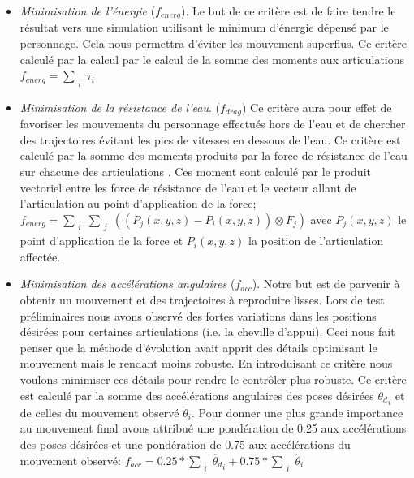 \documentclass[runningheads,a4paper]{llncs}
\begin{document}
\begin{itemize}
\item{\textit{Minimisation de l'énergie} ($f_{energ}$). Le but de ce critère est de faire tendre le résultat vers une simulation utilisant le minimum d'énergie dépensé par le personnage. Cela nous permettra d'éviter les mouvement superflus. Ce critère calculé par la calcul par le calcul de la somme des moments aux articulations $f_{energ}=\sum_{\substack{i}}{\tau_i}$} 
\item{\textit{Minimisation de la résistance de l'eau}. ($f_{drag}$) Ce critère aura pour effet de favoriser les mouvements du personnage effectués hors de l'eau et de chercher des trajectoires évitant les pics de vitesses en dessous de l'eau. Ce critère est calculé par la somme des moments produits par la force de résistance de l'eau sur chacune des articulations . Ces moment sont calculé par le produit vectoriel entre les force de résistance de l'eau et le vecteur allant de l'articulation au point d'application de la force; $f_{energ}=\sum_{\substack{i}}\sum_{\substack{j}}((P_j(x,y,z)-P_i(x,y,z)) \otimes  F_j)$ avec $P_j(x,y,z)$ le point d'application de la force et $P_i(x,y,z)$ la position de l'articulation affectée.}
\item{\textit{Minimisation des accélérations angulaires} ($f_{acc}$). Notre but est de parvenir à obtenir un mouvement et des trajectoires à reproduire lisses. Lors de test préliminaires nous avons observé des fortes variations dans les positions désirées pour certaines articulations (i.e. la cheville d'appui). Ceci nous fait penser que la méthode d'évolution avait apprit des détails optimisant le mouvement mais le rendant moins robuste. En introduisant ce critère nous voulons minimiser ces détails pour rendre le contrôler plus robuste. Ce critère est calculé par la somme des accélérations angulaires des poses désirées $\ddot{\theta_d}_i$ et de celles du mouvement observé $\ddot{\theta}_i$.  Pour donner une plus grande importance au mouvement final avons attribué une pondération de 0.25 aux accélérations des poses désirées et une pondération de 0.75 aux accélérations du mouvement observé: $f_{acc}=0.25*\sum_{\substack{i}}\ddot{\theta_d}_i+0.75*\sum_{\substack{i}}\ddot{\theta}_i$ }
\end{itemize}
\end{document}
